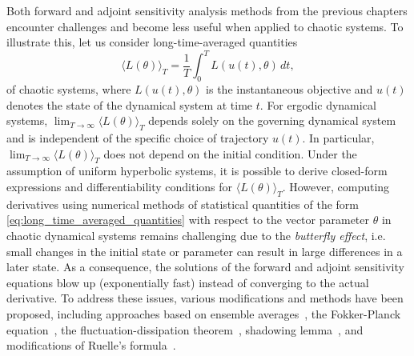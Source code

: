 Both forward and adjoint sensitivity analysis methods from the previous chapters encounter challenges and become less useful when applied to chaotic systems.
To illustrate this, let us consider long-time-averaged quantities 
\begin{equation}\label{eq:long_time_averaged_quantities}
    \langle L(\theta) \rangle_T = \frac{1}{T} \int_0^T L(u(t), \theta) \, dt, 
\end{equation}
of chaotic systems, where $L(u(t), \theta)$ is the instantaneous objective and $u(t)$ denotes the state of the dynamical system at time $t$.
For ergodic dynamical systems, $\lim_{T\to\infty} \langle L(\theta) \rangle_T$ depends solely on the governing dynamical system and is independent of the specific choice of trajectory $u(t)$. 
In particular, $\lim_{T\to\infty} \langle L(\theta) \rangle_T$ does not depend on the initial condition. 
Under the assumption of uniform hyperbolic systems, it is possible to derive closed-form expressions and differentiability conditions for $ \langle L(\theta) \rangle_T$\cite{ruelle1997differentiation,ruelle2009review}. 
However, computing derivatives using numerical methods of statistical quantities of the form \eqref{eq:long_time_averaged_quantities} with respect to the vector parameter $\theta$ in chaotic dynamical systems remains challenging due to the \textit{butterfly effect}, i.e. small changes in the initial state or parameter can result in large differences in a later state. 
As a consequence, the solutions of the forward and adjoint sensitivity equations blow up (exponentially fast) instead of converging to the actual derivative.
To address these issues, various modifications and methods have been proposed, including approaches based on ensemble averages~\cite{lea2000sensitivity, eyink2004ruelle}, the Fokker-Planck equation~\cite{thuburn2005climate, blonigan2014probability}, the fluctuation-dissipation theorem~\cite{leith1975climate, abramov2007blended, abramov2008new}, shadowing lemma~\cite{wang2013forward, wang2014least, wang2014convergence, ni2017sensitivity, blonigan2017adjoint, blonigan2018multiple, ni2019adjoint, ni2019sensitivity}, and modifications of Ruelle's formula~\cite{chandramoorthy2022efficient, ni2020fast}.